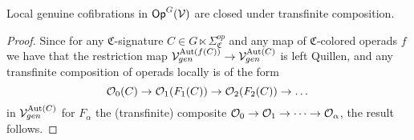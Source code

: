 \documentclass[a4paper,10pt
,draft
]{article}%
\renewcommand{\1}{\eta}%
\newcommand{\SC}{\Sigma_{\mathfrak C}}
\begin{document}
\begin{lemma}
      \label{TRANSCOMP_LGC_LEM}
      Local genuine cofibrations in $\mathsf{Op}^G(\mathcal V)$ are closed under transfinite composition.
\end{lemma}

\begin{proof}
      Since for any $\mathfrak C$-signature $C \in G \ltimes \SC^{op}$ and any map of $\mathfrak C$-colored operads $f$ we have that
      the restriction map
      $\mathcal V^{\operatorname{Aut}(f(C))}_{gen} \to \mathcal V^{\operatorname{Aut}(C)}_{gen}$
      is left Quillen,
      and any transfinite composition of operads locally is of the form
      \begin{equation}
            \mathcal{O}_0(C) \to \mathcal{O}_1(F_1(C)) \to \mathcal{O}_2(F_2(C)) \to \dots   
      \end{equation}
      in $\mathcal V^{\operatorname{Aut}(C)}_{gen}$
      for $F_\alpha$ the (transfinite) composite $\mathcal{O}_0 \to \mathcal{O}_1 \to \dots \to \mathcal{O}_\alpha$,
      the result follows.
\end{proof}
\end{document}
